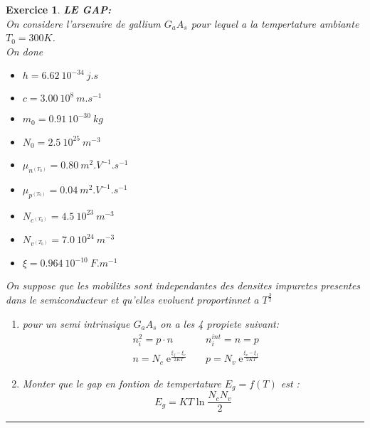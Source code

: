 \documentclass[twocolumn,french]{article}
\DeclareMathOperator{\e}{e}
\theoremstyle{plain}
\newtheorem{exo}{Exercice}%
\begin{document}
\color{black}
\begin{exo}
\textit{\textbf{ LE GAP:}} \\
On considere l'arsenuire de gallium $G_aA_s$ pour lequel a la tempertature
ambiante $T_0=300K$.\\
On done
\begin{itemize}
	\item[$\blacksquare$] $h = 6.62\ 10^{-34}\ j.s$
	\item[$\blacksquare$] $c = 3.00\ 10^8\ m.s^{-1}$
	\item[$\blacksquare$] $m_0 = 0.91\,10^{-30}\ kg$
  \item[$\blacksquare$] $N_0 = 2.5\ 10^{25}\ m^{-3}$
  \item[$\blacksquare$] $\mu_{n^{(T_0)}} = 0.80\ m^2.V^{-1}.s^{-1}$
  \item[$\blacksquare$] $\mu_{p^{(T_0)}} = 0.04\ m^2.V^{-1}.s^{-1}$
  \item[$\blacksquare$] $N_{c^{(T_0)}} = 4.5\ 10^{23}\ m^{-3}$
  \item[$\blacksquare$] $N_{v^{(T_0)}} = 7.0\ 10^{24}\ m^{-3}$
  \item[$\blacksquare$] $\xi = 0.964\ 10^{-10}\ F.m^{-1}$
\end{itemize}
On suppose que les mobilites sont independantes des densites 
impuretes presentes dans le semiconducteur et qu'elles evoluent
proportinnet a $T^{\frac{3}{2}}$

\begin{enumerate}
  \item[] pour un semi intrinsique $G_aA_s$ on a les 4 
   propiete suivant:
  \begin{align*}
    &n_i^2=p\cdot n                       &  &n_i^{int}=n=p            \\
    &n=N_c\e^{\frac{\xi_f-\xi_c}{2KT}}    &  &p=N_v\e^{\frac{\xi_v-\xi_f}{2KT}} 
  \end{align*}
\item Monter que le gap en fontion de tempertature $E_g=f(T)$ est :
    \begin{equation}
      E_g=KT\ln \frac{N_cN_v}{2}
      \label{eq:1}
    \end{equation}
    
\end{enumerate}


\end{exo}
\hrule


\end{document}

